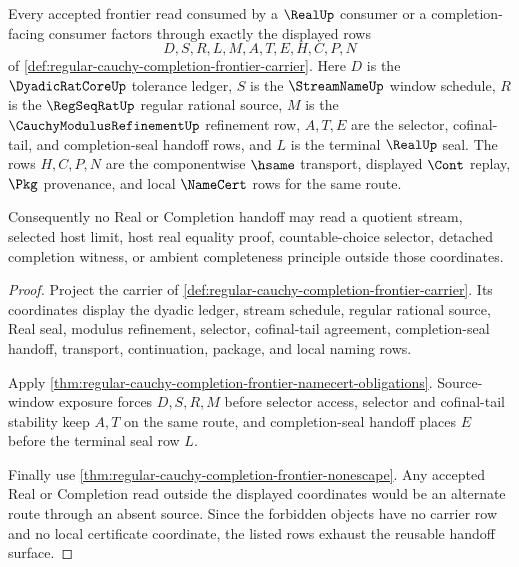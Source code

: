 \begin{theorem}
\label{thm:regular-cauchy-completion-frontier-source-exhaustion}
Every accepted frontier read consumed by a $\RealUp$ consumer or a completion-facing consumer factors through exactly the displayed rows
$$
D,S,R,L,M,A,T,E,H,C,P,N
$$
of \autoref{def:regular-cauchy-completion-frontier-carrier}. Here $D$ is the $\DyadicRatCoreUp$ tolerance ledger, $S$ is the $\StreamNameUp$ window schedule, $R$ is the $\RegSeqRatUp$ regular rational source, $M$ is the $\CauchyModulusRefinementUp$ refinement row, $A,T,E$ are the selector, cofinal-tail, and completion-seal handoff rows, and $L$ is the terminal $\RealUp$ seal. The rows $H,C,P,N$ are the componentwise $\hsame$ transport, displayed $\Cont$ replay, $\Pkg$ provenance, and local $\NameCert$ rows for the same route.

Consequently no Real or Completion handoff may read a quotient stream, selected host limit, host real equality proof, countable-choice selector, detached completion witness, or ambient completeness principle outside those coordinates.
\end{theorem}
\begin{proof}
Project the carrier of \autoref{def:regular-cauchy-completion-frontier-carrier}. Its coordinates display the dyadic ledger, stream schedule, regular rational source, Real seal, modulus refinement, selector, cofinal-tail agreement, completion-seal handoff, transport, continuation, package, and local naming rows.

Apply \autoref{thm:regular-cauchy-completion-frontier-namecert-obligations}. Source-window exposure forces $D,S,R,M$ before selector access, selector and cofinal-tail stability keep $A,T$ on the same route, and completion-seal handoff places $E$ before the terminal seal row $L$.

Finally use \autoref{thm:regular-cauchy-completion-frontier-nonescape}. Any accepted Real or Completion read outside the displayed coordinates would be an alternate route through an absent source. Since the forbidden objects have no carrier row and no local certificate coordinate, the listed rows exhaust the reusable handoff surface.
\end{proof}

